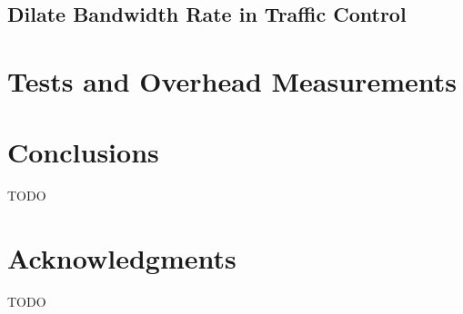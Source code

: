 \documentclass{acm_proc_article-sp}
\begin{document}
\subsection{Dilate Bandwidth Rate in Traffic Control}

\section{Tests and Overhead Measurements}

\section{Conclusions}
TODO

\section{Acknowledgments}
TODO
%


%
%
\balancecolumns
\end{document}
